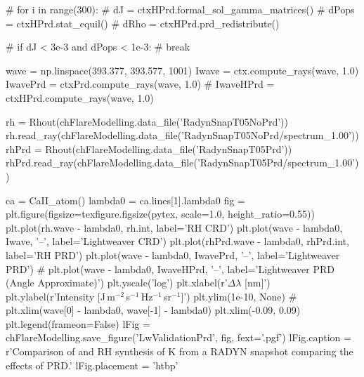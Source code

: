 \begin{pycode}[FlareModelling]
# for i in range(300):
#     dJ = ctxHPrd.formal_sol_gamma_matrices()
#     dPops = ctxHPrd.stat_equil()
#     dRho = ctxHPrd.prd_redistribute()

#     if dJ < 3e-3 and dPops < 1e-3:
#         break

wave = np.linspace(393.377, 393.577, 1001)
Iwave = ctx.compute_rays(wave, 1.0)
IwavePrd = ctxPrd.compute_rays(wave, 1.0)
# IwaveHPrd = ctxHPrd.compute_rays(wave, 1.0)

rh = Rhout(chFlareModelling.data_file('RadynSnapT05NoPrd'))
rh.read_ray(chFlareModelling.data_file('RadynSnapT05NoPrd/spectrum_1.00'))
rhPrd = Rhout(chFlareModelling.data_file('RadynSnapT05Prd'))
rhPrd.read_ray(chFlareModelling.data_file('RadynSnapT05Prd/spectrum_1.00'))

ca = CaII_atom()
lambda0 = ca.lines[1].lambda0
fig = plt.figure(figsize=texfigure.figsize(pytex, scale=1.0, height_ratio=0.55))
plt.plot(rh.wave - lambda0, rh.int, label='RH CRD')
plt.plot(wave - lambda0, Iwave, '--', label='Lightweaver CRD')
plt.plot(rhPrd.wave - lambda0, rhPrd.int, label='RH PRD')
plt.plot(wave - lambda0, IwavePrd, '--', label='Lightweaver PRD')
# plt.plot(wave - lambda0, IwaveHPrd, '--', label='Lightweaver PRD (Angle Approximate)')
plt.yscale('log')
plt.xlabel(r'$\Delta\lambda$ [nm]')
plt.ylabel(r'Intensity [J\,m$^{-2}$\,s$^{-1}$\,Hz$^{-1}$\,sr$^{-1}$]')
plt.ylim(1e-10, None)
# plt.xlim(wave[0] - lambda0, wave[-1] - lambda0)
plt.xlim(-0.09, 0.09)
plt.legend(frameon=False)
lFig = chFlareModelling.save_figure('LwValidationPrd', fig, fext='.pgf')
lFig.caption = r'Comparison of \Lw{} and RH synthesis of \Caii{} K from a RADYN snapshot comparing the effects of PRD.'
lFig.placement = 'htbp'
\end{pycode}
